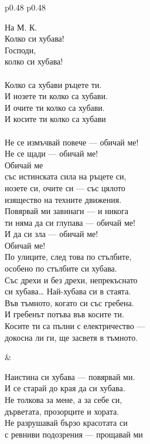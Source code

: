 \documentclass[12pt,a4paper]{article}
\begin{document}
\begin{tabular}{p{0.48\textwidth} p{0.48\textwidth}}
\begin{minipage}[t]{\linewidth}
На М. К.\\
Колко си хубава!\\
Господи,\\
колко си хубава!\\
\\
Колко са хубави ръцете ти.\\
И нозете ти колко са хубави.\\
И очите ти колко са хубави.\\
И косите ти колко са хубави\\
\\
Не се измъчвай повече — обичай ме!\\
Не се щади — обичай ме!\\
Обичай ме\\
със истинската сила на ръцете си,\\
нозете си, очите си — със цялото\\
изящество на техните движения.\\
Повярвай ми завинаги — и никога\\
ти няма да си глупава — обичай ме!\\
И да си зла — обичай ме!\\
Обичай ме!\\
По улиците, след това по стълбите,\\
особено по стълбите си хубава.\\
Със дрехи и без дрехи, непрекъснато\\
си хубава… Най-хубава си в стаята.\\
Във тъмното, когато си със гребена.\\
И гребенът потъва във косите ти.\\
Косите ти са пълни с електричество —\\
докосна ли ги, ще засветя в тъмното.\\
\end{minipage}
&
\begin{minipage}[t]{\linewidth}
Наистина си хубава — повярвай ми.\\
И се старай до края да си хубава.\\
Не толкова за мене, а за себе си,\\
дърветата, прозорците и хората.\\
Не разрушавай бързо красотата си\\
с ревниви подозрения — прощавай ми\\

\end{minipage}
\end{tabular}
\end{document}
